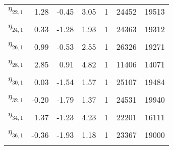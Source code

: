 \begin{table}
\begin{tabular}[t]{lrrrrrr}
$\eta_{22,  1}$ & 1.28 & -0.45 & 3.05 & 1 & 24452 & 19513\\
\cellcolor{gray!6}{$\eta_{23,  1}$} & \cellcolor{gray!6}{1.39} & \cellcolor{gray!6}{-0.52} & \cellcolor{gray!6}{3.40} & \cellcolor{gray!6}{1} & \cellcolor{gray!6}{22193} & \cellcolor{gray!6}{19337}\\
$\eta_{24,  1}$ & 0.33 & -1.28 & 1.93 & 1 & 24363 & 19312\\
\cellcolor{gray!6}{$\eta_{25,  1}$} & \cellcolor{gray!6}{1.74} & \cellcolor{gray!6}{-0.22} & \cellcolor{gray!6}{3.80} & \cellcolor{gray!6}{1} & \cellcolor{gray!6}{15355} & \cellcolor{gray!6}{19096}\\
$\eta_{26,  1}$ & 0.99 & -0.53 & 2.55 & 1 & 26326 & 19271\\
\cellcolor{gray!6}{$\eta_{27,  1}$} & \cellcolor{gray!6}{0.94} & \cellcolor{gray!6}{-0.47} & \cellcolor{gray!6}{2.36} & \cellcolor{gray!6}{1} & \cellcolor{gray!6}{29327} & \cellcolor{gray!6}{19600}\\
$\eta_{28,  1}$ & 2.85 & 0.91 & 4.82 & 1 & 11406 & 14071\\
\cellcolor{gray!6}{$\eta_{29,  1}$} & \cellcolor{gray!6}{-0.49} & \cellcolor{gray!6}{-1.76} & \cellcolor{gray!6}{0.78} & \cellcolor{gray!6}{1} & \cellcolor{gray!6}{25509} & \cellcolor{gray!6}{18934}\\
$\eta_{30,  1}$ & 0.03 & -1.54 & 1.57 & 1 & 25107 & 19484\\
\cellcolor{gray!6}{$\eta_{31,  1}$} & \cellcolor{gray!6}{1.33} & \cellcolor{gray!6}{-0.88} & \cellcolor{gray!6}{3.67} & \cellcolor{gray!6}{1} & \cellcolor{gray!6}{23575} & \cellcolor{gray!6}{19151}\\
$\eta_{32,  1}$ & -0.20 & -1.79 & 1.37 & 1 & 24531 & 19940\\
\cellcolor{gray!6}{$\eta_{33,  1}$} & \cellcolor{gray!6}{2.74} & \cellcolor{gray!6}{0.07} & \cellcolor{gray!6}{5.98} & \cellcolor{gray!6}{1} & \cellcolor{gray!6}{10830} & \cellcolor{gray!6}{14500}\\
$\eta_{34,  1}$ & 1.37 & -1.23 & 4.23 & 1 & 22201 & 16111\\
\cellcolor{gray!6}{$\eta_{35,  1}$} & \cellcolor{gray!6}{0.75} & \cellcolor{gray!6}{-0.88} & \cellcolor{gray!6}{2.44} & \cellcolor{gray!6}{1} & \cellcolor{gray!6}{25014} & \cellcolor{gray!6}{18186}\\
$\eta_{36,  1}$ & -0.36 & -1.93 & 1.18 & 1 & 23367 & 19000\\
\cellcolor{gray!6}{$\sigma_{y}$} & \cellcolor{gray!6}{0.90} & \cellcolor{gray!6}{0.80} & \cellcolor{gray!6}{1.01} & \cellcolor{gray!6}{1} & \cellcolor{gray!6}{18498} & \cellcolor{gray!6}{17938}\\
\bottomrule
\end{tabular}
\end{table}